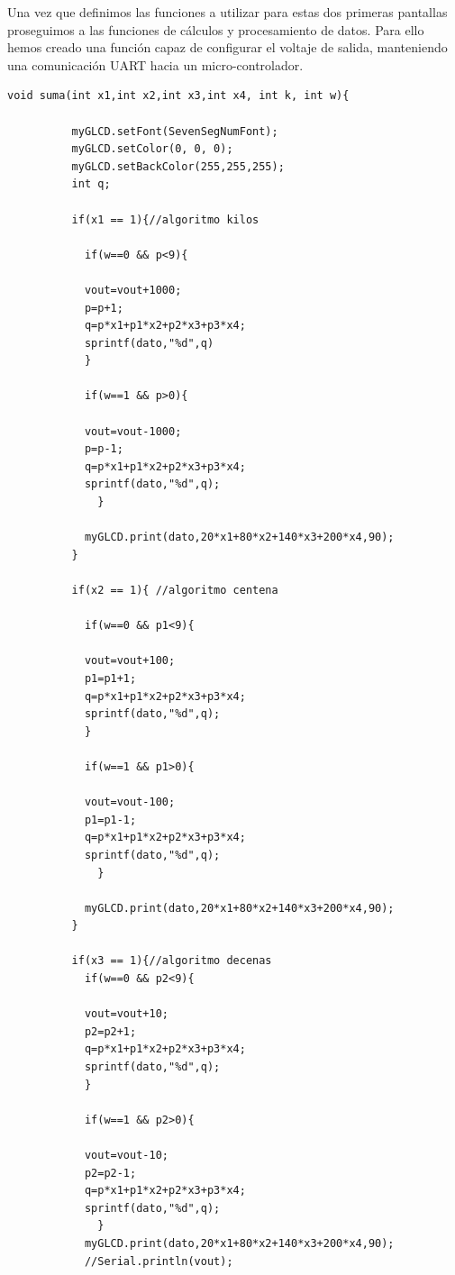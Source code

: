 Una vez que definimos las funciones a utilizar para estas dos primeras pantallas proseguimos a las funciones de cálculos y procesamiento de datos. Para ello hemos creado una función capaz de configurar el voltaje de salida, manteniendo una comunicación UART hacia un micro-controlador. 

\begin{verbatim}
void suma(int x1,int x2,int x3,int x4, int k, int w){ 

          myGLCD.setFont(SevenSegNumFont);
          myGLCD.setColor(0, 0, 0);
          myGLCD.setBackColor(255,255,255);
          int q;  
          
          if(x1 == 1){//algoritmo kilos
          
            if(w==0 && p<9){
            
            vout=vout+1000;
            p=p+1;
            q=p*x1+p1*x2+p2*x3+p3*x4;
            sprintf(dato,"%d",q)
            }
            
            if(w==1 && p>0){
            
            vout=vout-1000;
            p=p-1;
            q=p*x1+p1*x2+p2*x3+p3*x4;
            sprintf(dato,"%d",q);
              }
              
            myGLCD.print(dato,20*x1+80*x2+140*x3+200*x4,90);
          }
          
          if(x2 == 1){ //algoritmo centena
          
            if(w==0 && p1<9){
            
            vout=vout+100;
            p1=p1+1;
            q=p*x1+p1*x2+p2*x3+p3*x4;
            sprintf(dato,"%d",q);
            }
            
            if(w==1 && p1>0){
            
            vout=vout-100;
            p1=p1-1;
            q=p*x1+p1*x2+p2*x3+p3*x4;
            sprintf(dato,"%d",q);
              }
              
            myGLCD.print(dato,20*x1+80*x2+140*x3+200*x4,90);
          }
          
          if(x3 == 1){//algoritmo decenas
            if(w==0 && p2<9){
            
            vout=vout+10;
            p2=p2+1;
            q=p*x1+p1*x2+p2*x3+p3*x4;
            sprintf(dato,"%d",q);
            }
           
            if(w==1 && p2>0){
            
            vout=vout-10;
            p2=p2-1;
            q=p*x1+p1*x2+p2*x3+p3*x4;
            sprintf(dato,"%d",q);
              }
            myGLCD.print(dato,20*x1+80*x2+140*x3+200*x4,90);
            //Serial.println(vout);
            

\end{verbatim}
